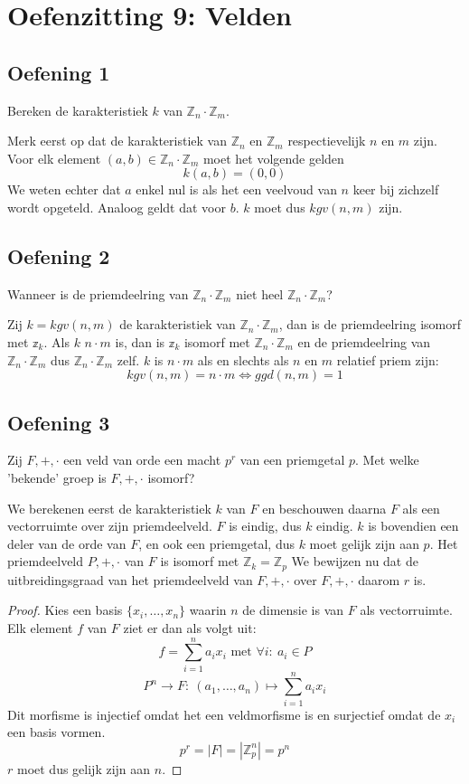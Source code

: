 \documentclass[main.tex]{subfiles}
\begin{document}
\section{Oefenzitting 9: Velden}

\subsection*{Oefening 1}
Bereken de karakteristiek $k$ van $\mathbb{Z}_{n} \cdot \mathbb{Z}_{m}$.

Merk eerst op dat de karakteristiek van $\mathbb{Z}_{n}$ en $\mathbb{Z}_{m}$ respectievelijk $n$ en $m$ zijn.
Voor elk element $(a,b) \in \mathbb{Z}_{n} \cdot \mathbb{Z}_{m}$ moet het volgende gelden
\[ k(a,b) = (0,0) \]
We weten echter dat $a$ enkel nul is als het een veelvoud van $n$ keer bij zichzelf wordt opgeteld.
Analoog geldt dat voor $b$.
$k$ moet dus $kgv(n,m)$ zijn.


\subsection*{Oefening 2}
Wanneer is de priemdeelring van $\mathbb{Z}_{n} \cdot \mathbb{Z}_{m}$ niet heel $\mathbb{Z}_{n} \cdot \mathbb{Z}_{m}$?

Zij $k=kgv(n,m)$ de karakteristiek van $\mathbb{Z}_{n} \cdot \mathbb{Z}_{m}$, dan is de priemdeelring isomorf met $\mathbb{z}_{k}$.
Als $k$ $n\cdot m$ is, dan is $\mathbb{z}_{k}$ isomorf met $\mathbb{Z}_{n} \cdot \mathbb{Z}_{m}$ en de priemdeelring van $\mathbb{Z}_{n} \cdot \mathbb{Z}_{m}$ dus $\mathbb{Z}_{n} \cdot \mathbb{Z}_{m}$ zelf.
$k$ is $n\cdot m$ als en slechts als $n$ en $m$ relatief priem zijn:
\[ kgv(n,m) = n \cdot m \Leftrightarrow ggd(n,m) = 1 \]

\subsection*{Oefening 3}

Zij $F,+,\cdot$ een veld van orde een macht $p^{r}$ van een priemgetal $p$.
Met welke 'bekende' groep is $F,+,\cdot$ isomorf?

We berekenen eerst de karakteristiek $k$ van $F$ en beschouwen daarna $F$ als een vectorruimte over zijn priemdeelveld.
$F$ is eindig, dus $k$ eindig.
$k$ is bovendien een deler van de orde van $F$, en ook een priemgetal, dus $k$ moet gelijk zijn aan $p$.
Het priemdeelveld $P,+,\cdot$ van $F$ is isomorf met $\mathbb{Z}_{k} = \mathbb{Z}_{p}$ 
We bewijzen nu dat de uitbreidingsgraad van het priemdeelveld van $F,+,\cdot$ over $F,+,\cdot$ daarom $r$ is.
\begin{proof}
  Kies een basis $\{x_{i},\dotsc,x_{n}\}$ waarin $n$ de dimensie is van $F$ als vectorruimte.
  Elk element $f$ van $F$ ziet er dan als volgt uit:
  \[ f = \sum_{i=1}^{n}a_{i}x_{i} \text { met } \forall i:\ a_{i} \in P\]
  \[ P^{n} \rightarrow F:\ (a_{1},\dotsc,a_{n})\mapsto \sum_{i=1}^{n}a_{i}x_{i} \]
  Dit morfisme is injectief omdat het een veldmorfisme is en surjectief omdat de $x_{i}$ een basis vormen.
  \[ p^{r} = |F| = |\mathbb{Z}_{p}^{n}| = p^{n}\]
  $r$ moet dus gelijk zijn aan $n$.
\end{proof}
\end{document}
